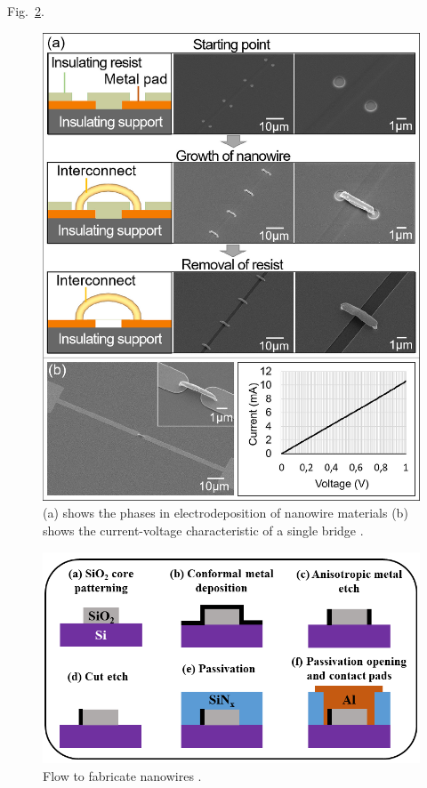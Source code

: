 \documentclass[conference]{IEEEtran}
\begin{document}
Fig.~\ref{fig:inter_fab}.
\begin{figure}[!htb]
    \centering
    \includegraphics[width=\linewidth]{figures/electrodepo.png}
    \caption{(a) shows the phases in electrodeposition of nanowire materials (b) shows the current-voltage characteristic of a single bridge
    \cite{8605857}.}\label{fig:electrodepo}
\end{figure}
\begin{figure}[!htb]
    \centering
    \includegraphics[width=\linewidth]{figures/inter_fab.png}
    \caption{Flow to fabricate nanowires \cite{7968937}.}\label{fig:inter_fab}
\end{figure}
\end{document}
